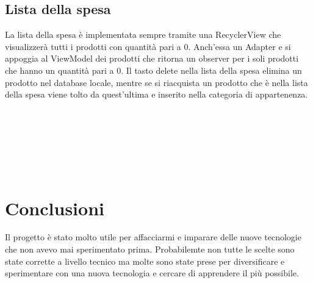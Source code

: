 \documentclass[12pt]{article}
\begin{document}
    \subsection{Lista della spesa}
    La lista della spesa è implementata sempre tramite una RecyclerView che visualizzerà tutti i prodotti con quantità
    pari a 0. Anch'essa un Adapter  e si appoggia al ViewModel dei prodotti che ritorna un observer per i soli prodotti che hanno un quantità 
    pari a 0. Il tasto delete nella lista della spesa elimina un prodotto nel database locale, mentre se si riacquista un prodotto
    che è nella lista della spesa viene tolto da quest'ultima e inserito nella categoria di appartenenza.
    \\\\\\\\\\\\\\

    \section{Conclusioni}
    Il progetto è stato molto utile per affacciarmi e imparare delle nuove tecnologie che non avevo mai sperimentato prima.
    Probabilemte non tutte le scelte sono state corrette a livello tecnico ma molte sono state prese per diversificare e sperimentare
    con una nuova tecnologia e cercare di apprendere il più possibile. 
    
\end{document}
